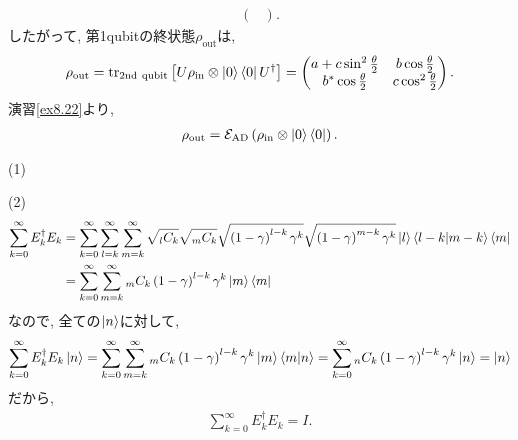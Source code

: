 \begin{ex}
\begin{align*}
\begin{pmatrix}
        \end{pmatrix}.
    \end{align*}
    したがって, 第1qubitの終状態$\rho_\mathrm{out}$は,
    \begin{align*}
        \rho_\mathrm{out}
        =
        \mathrm{tr}_\mathrm{2nd\ qubit} \left[U  \rho_\mathrm{in} \otimes \ket{0}\bra{0} U^\dagger\right]
        =
        \begin{pmatrix}
            a + c \sin^2 \frac{\theta}{2} & b \cos\frac{\theta}{2}   \\
            b^* \cos \frac{\theta}{2}     & c \cos^2\frac{\theta}{2}
        \end{pmatrix}.
    \end{align*}
    演習\ref{ex8.22}より,
    \begin{align*}
        \rho_\mathrm{out} = \mathcal{E}_\mathrm{AD}\left( \rho_\mathrm{in} \otimes \ket{0} \bra{0}\right).
    \end{align*}
\end{ex}

\begin{ex}
    \label{ex8.21}
    (1)\ \par
    (2) \
    \begin{align*}
        \sum_{k=0}^{\infty} E_k^\dagger E_k
         & =
        \sum_{k=0}^{\infty}
        \sum_{l=k}^{\infty}
        \sum_{m=k}^{\infty}
        \sqrt{{}_l C_k}\sqrt{{}_m C_k}
        \sqrt{\left(1- \gamma\right)^{l-k}\gamma^k}
        \sqrt{\left(1- \gamma\right)^{m-k}\gamma^k}
        \ket{l}\braket{l-k|m-k}\bra{m}
        \\
         & =
        \sum_{k=0}^{\infty}
        \sum_{m=k}^{\infty}
        {}_m C_k
        \left(1- \gamma\right)^{l-k}\gamma^k
        \ket{m}\bra{m}
    \end{align*}
    なので, 全ての$\ket{n}$に対して,
    \begin{align*}
        \sum_{k=0}^{\infty} E_k^\dagger E_k \ket{n} =
        \sum_{k=0}^{\infty}
        \sum_{m=k}^{\infty}
        {}_m C_k
        \left(1- \gamma\right)^{l-k}\gamma^k
        \ket{m}\braket{m|n}
        =
        \sum_{k=0}^{\infty}
        {}_n C_k
        \left(1- \gamma\right)^{l-k}\gamma^k
        \ket{n}
        =
        \ket{n}
    \end{align*}
    だから,
    \begin{align*}
        \sum_{k=0}^{\infty} E_k^\dagger E_k = I.
    \end{align*}
\end{ex}

